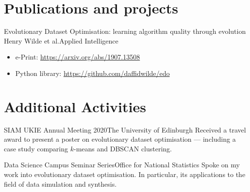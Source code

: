 \documentclass[11pt, sans, a4paper]{moderncv}
\begin{document}
\clearpage%
\section{Publications and projects}

%
    {%
        Evolutionary Dataset Optimisation: learning algorithm quality through
        evolution%
    }{Henry Wilde et al.}{Applied Intelligence}{}{%
        \begin{itemize}
            \item e-Print: \url{https://arxiv.org/abs/1907.13508}
            \item Python library: \url{https://github.com/daffidwilde/edo}
        \end{itemize}
    }


\section{Additional Activities}

%
    {SIAM UKIE Annual Meeting 2020}{The University of Edinburgh}{}{}{%
        Received a travel award to present a poster on evolutionary dataset
        optimisation --- including a case study comparing \(k\)-means and DBSCAN
        clustering.
    }


%
    {Data Science Campus Seminar Series}{Office for National Statistics}{}{}{%
        Spoke on my work into evolutionary dataset optimisation. In particular,
        its applications to the field of data simulation and synthesis.
    }

\end{document}
